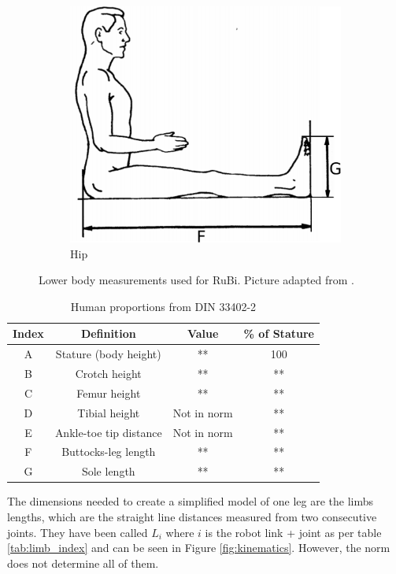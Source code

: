 \begin{figure}[h]
\begin{subfigure}[b]{0.4\textwidth}
        \includegraphics[width=\textwidth]{figures/din_measurements2.pdf}
        \caption{Hip}
        \label{fig:din2}
    \end{subfigure}
	\caption{Lower body measurements used for RuBi. Picture adapted from \cite{din_measurements1}.}
	\label{fig:human_measurements}
\end{figure}


\begin{table}
\begin{center}
	\begin{tabular}{c | c | c | c}
	  Index & Definition & Value & \% of Stature \\
	  \hline
	  A & Stature (body height) & ** & 100 \\
	  B & Crotch height & ** & ** \\
	  C & Femur height & ** & ** \\
	  D & Tibial height & Not in norm & **\\
	  E & Ankle-toe tip distance & Not in norm & ** \\
	  F & Buttocks-leg length & ** & ** \\
	  G & Sole length & ** & **
	\end{tabular}
	\caption{Human proportions from DIN 33402-2}
	\label{tab:din_proportions}
\end{center}
\end{table}

The dimensions needed to create a simplified model of one leg are the limbs lengths, which are the straight line distances measured from two consecutive joints.
They have been called $L_{i}$ where $i$ is the robot link + joint as per table \ref{tab:limb_index} and can be seen in Figure \ref{fig:kinematics}.
However, the norm does not determine all of them.

